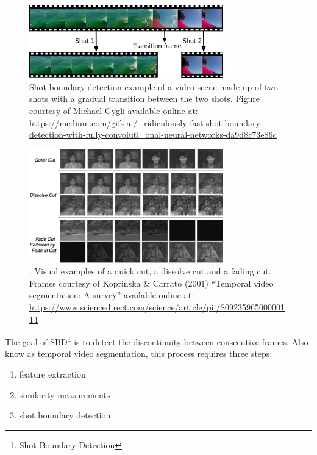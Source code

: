 \begin{figure}[h] 
\centerline{\includegraphics[width=0.75\textwidth]{figures/litsurvey/shot_boundary_detection.png}}
\caption{\label{fig:shot_boundary_detection}Shot boundary detection example of a video scene made up of two shots with a gradual transition between the two shots. Figure courtesy of Michael Gygli available online at: \url{https://medium.com/gifs-ai/\_ridiculously-fast-shot-boundary-detection-with-fully-convoluti\_onal-neural-networks-da9d8c73e86c}}
\end{figure}

\begin{figure}[h] 
\centerline{\includegraphics[width=0.75\textwidth]{figures/litsurvey/video_transitions.png}}
\caption{\label{fig:video_transitions}. Visual examples of a quick cut, a dissolve cut and a fading cut. Frames courtesy of Koprinska \& Carrato (2001) ``Temporal video segmentation: A survey'' available online at: \url{https://www.sciencedirect.com/science/article/pii/S0923596500000114}}
\end{figure}

The goal of SBD\footnote{Shot Boundary Detection} is to detect the discontinuity between consecutive frames. Also know as temporal video segmentation, this process requires three steps:
\begin{enumerate}
    \item feature extraction
    \item similarity measurements
    \item shot boundary detection
\end{enumerate}


